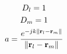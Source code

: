 \documentclass[10pt]{report}
\begin{document}
\begin{gather*}
	D_l = 1 \\
	D_m = 1 \\
	a = \frac{e^{-j k \left\| \mathbf{r}_{l} - \mathbf{r}_{m} \right\|}}{\left\| \mathbf{r}_{l} - \mathbf{r}_{m} \right\|}
\end{gather*}
%
%
%	
%	
%
%	
%	
%
%	
%
%
%
\end{document}
